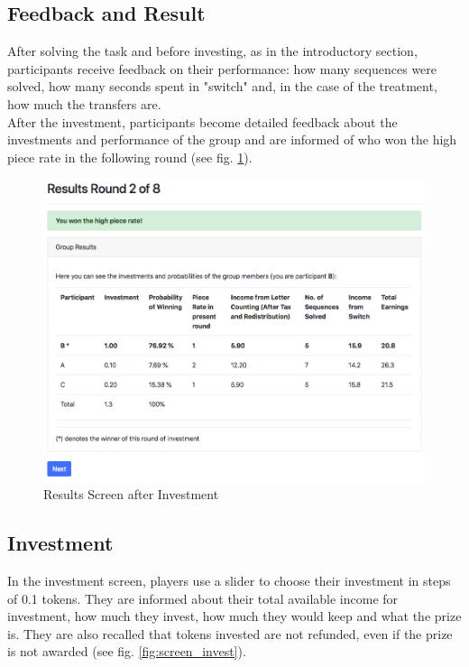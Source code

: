     \subsection{Feedback and Result}
    
    After solving the task and before investing, as in the introductory section, participants receive feedback on their performance: how many sequences were solved, how many seconds spent in "switch" and, in the case of the treatment, how much the transfers are.\\
    
    After the investment, participants become detailed feedback about the investments and performance of the group and are informed of who won the high piece rate in the following round (see fig. \ref{fig:screen_results}).
    
    \begin{figure}
        \centering
        \includegraphics[width=\textwidth]{graphs/screen_results.png}
        \caption{Results Screen after Investment}
        \label{fig:screen_results}
    \end{figure}
    
    \subsection{Investment}
    
    In the investment screen, players use a slider to choose their investment in steps of 0.1 tokens. They are informed about their total available income for investment, how much they invest, how much they would keep and what the prize is. They are also recalled that tokens invested are not refunded, even if the prize is not awarded (see fig. \ref{fig:screen_invest}).
    

